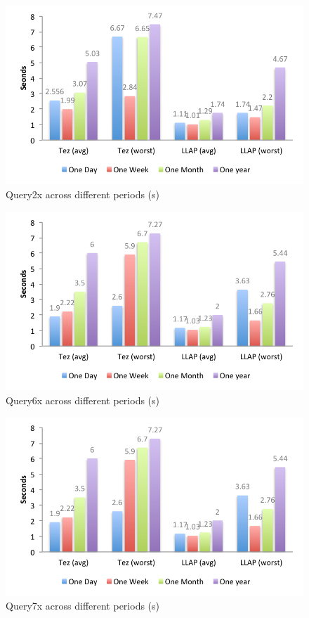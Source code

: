 \begin{figure}[bthp]
\centering
\includegraphics[width=0.9\columnwidth]{figures/q2x.pdf}
\caption{Query2x across different periods (s)}
\label{fig:q2x}
\end{figure} 

\begin{figure}[bthp]
\centering
\includegraphics[width=0.9\columnwidth]{figures/q6x.pdf}
\caption{Query6x across different periods (s)}
\label{fig:q6x}
\end{figure} 

\begin{figure}[bthp]
\centering
\includegraphics[width=0.9\columnwidth]{figures/q7x.pdf}
\caption{Query7x across different periods (s)}
\label{fig:q7x}
\end{figure} 


